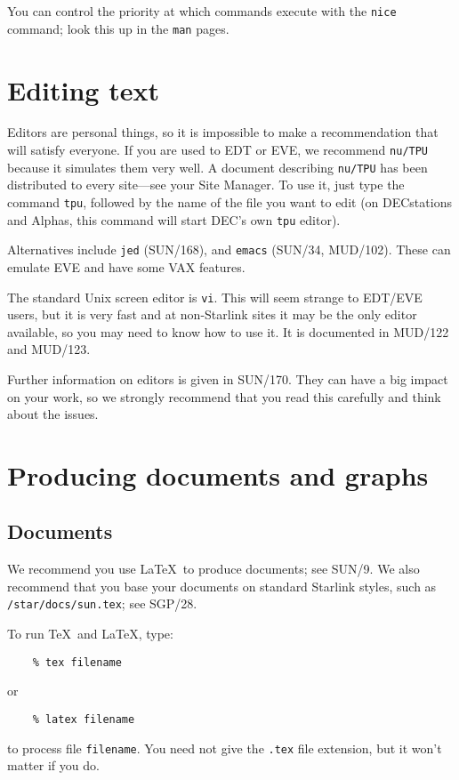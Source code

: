 You can control the priority at which commands execute with the {\tt nice}
command; look this up in the {\tt man} pages.

\section{Editing text}

Editors are personal things, so it is impossible to make a recommendation
that will satisfy everyone.
If you are used to EDT or EVE, we recommend {\tt nu/TPU} because it simulates
them very well.
A document describing {\tt nu/TPU} has been distributed to every site---see
your Site Manager.
To use it, just type the command {\tt tpu}, followed by the name of the file
you want to edit (on DECstations and Alphas, this command will start DEC's own
{\tt tpu} editor).

Alternatives include {\tt jed} (SUN/168), and {\tt emacs} (SUN/34, MUD/102).
These can emulate EVE and have some VAX features.

The standard Unix screen editor is {\tt vi}.
This will seem strange to EDT/EVE users, but it is very fast and at non-Starlink
sites it may be the only editor available, so you may need to know how to use
it.
It is documented in MUD/122 and MUD/123.

Further information on editors is given in SUN/170.
They can have a big impact on your work, so we strongly recommend that you
read this carefully and think about the issues.

\section{Producing documents and graphs}

\subsection{Documents}

We recommend you use \LaTeX\ to produce documents; see SUN/9.
We also recommend that you base your documents on standard Starlink styles,
such as {\tt /star/docs/sun.tex}; see SGP/28.

To run \TeX\ and \LaTeX, type:
\begin{verbatim}
    % tex filename
\end{verbatim}
or
\begin{verbatim}
    % latex filename
\end{verbatim}
to process file {\tt filename}.
You need not give the {\tt .tex} file extension, but it won't matter if you
do. 

